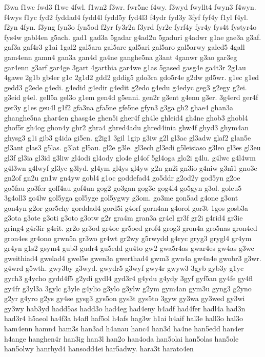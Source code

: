 {f3wa
f1wc
fwd3
f1we
4fwl.
f1wn2
f3wr.
fwr5ne
f4wy.
f3wyd
fwyllt4
fwyn3
f4wyn.
f4wys
f1yc
fyd2
fyddad4
fydd4l
fydd5y
fyd4l3
f4ydr
fyd3y
3fyf
fyf4y
f1yl
f4yl.
f2yn
4fyn.
f3yng
fyn3o
fyn5od
f2yr
fy3r2a
f3yrd
fyr2e
fyrf4y
fyr4y
fys4t
fystyr4o
fys4w
gabl4en
g5ach.
gad1
gad3a
5gadar
g4ad2u
5gaduri
g4adwr
g1ae
gae3a
g3af.
gaf3a
gaf4r3
g1ai
1gal2
gal5ara
gal5are
gal5ari
gal5aro
gal5arwy
galed5
4gall
gam4enn
gamn4
gan3a
gan4d
ga4ne
ganghe5na
g3ant
4ganwr
g3ao
gar3eg
gar4enn
g3arf
gar4ge
3gart
4garthia
gar4we
g1as
5gased
gasg4e
ga4t3r
2g1au
4gawe
2g1b
gb4er
g1c
2g1d2
gdd2
gddig5
gdo3ra
gdo5r4e
g2dw
gd5wr.
g1ec
g1ed
gedd3
g2ede
g4edi.
g4edid
g4edir
g4edit
g2edo
g4edu
g4edyc
geg3
g2egy
g2ei.
g3eid
g4el.
gell5a
gel3o
g1em
gen4d
g5enni.
gen2r
g3ent
g4enu
g3er.
3g4erd
ger4f
ger3y
g1es
geu4l
g1f2
gfa3na
gfa5ne
gfe5ne
gfyn3
g3ga
gh2
ghae4
ghan3a
ghanghe5na
ghar4en
ghasg4e
ghen5i
gher4f
gh4le
ghleid4
gh4ne
ghob3
ghobl4
ghof5r
gh4og
ghon4y
ghr2
ghra4
ghred4adu
ghred4inia
ghw4f
ghyd3
ghym4an
ghysg3
g1i
gib3
g4ida
gi5en.
g2ig1
3gil
1gip
g3iw
g2l
gl3ac
gl3adw
glaf2
glan5e
gl3ant
glas3
g5las.
g3lat
gl5au.
gl2e
g3le.
gl3ech
gl3edi
g5leisiaso
g3leo
gl3es
gl3eu
gl3f
gl3ia
gl3id
g3liw
gl4odi
gl4ody
glo4e
gl4of
5gl4oga
glo2i
g4lu.
g4lwc
g4l4wm
g4l3wn
g4lwyf
gl3yc
g3lyd.
gl4ym
gl4ys
gl4yw
g2n
gn2i
gn3io
g4niw
g3nï1
gno3e
gn2of
gn2u
gn1w
gn4yw
gobl4
g1oc
goddefad4
go5ddr
g2od2y
god5yn
g2oe
go5fau
go3fer
goff4au
gof4un
gog2
go3gan
gog3e
gog4l4
go5gyn
g3ol.
goleu5
3g4oll3
go4lw
gol5yga
gol5yge
gol5ygwy
g3om.
go3me
gon5ad
g4one
g3ont
gon4yn
g2or
gor5chy
gorddad4
gord5i
g4orf
gorn4an
g4orol
gor3t
1gos
gosb3a
g3ota
g3ote
g3oti
g3oto
g3otw
g2r
gra4m
gran3a
gr4el
gr3f
gr2i
g4rid4
gr3ie
gring4
g4r3ir
g4rit.
gr2o
gr3od
gr4oe
gr5oed
grof4
grog3
gron4a
gro5nas
gron4ed
gron4es
gr4ono
grwn5a
gr3wo
gr4wt
gr2wy
g5rwydd
g4ryc
gryg3
grygl4
gr4ym
gr4yn
g1s2
gsym4
gub3
gudr4
gu5edd
gu4to
gw2
gwa5r4as
gwar4es
gw4as
g3wc
gweithiad4
gwelad4
gwel5e
gwen3a
gwerthad4
gwm3
gwn4a
gw4n4e
gwobr3
g3wr.
g4wrd
g5wth.
gwy3by
g3wyd.
gwydr5
g3wyf
gwy4r
gwyw3
3gyb
gyb3y
g1yc
gych3
g4ycho
gydd4f5
g2ydi
gydl4
gyd3r4
g4ydu
g4ydy
3gyf
gyf5an
gy4fe
gy4fl
gy4fr
g3yl3a
3gylc
g3yle
g4ylio
g3ylo
g3ylw
g2ym
gym4an
gym3u
gyng3
g2yno
g2yr
g4yro
g2ys
gy4se
gysg3
gys5on
gys3t
gys5to
3gyw
gy3wa
gy3wed
gy3wi
gy3wy
hab3yd
hadd5as
hadd3o
had4eg
had4eny
h4adf
had4fer
hadl4a
had3n
had3r4
h5aeol
ha4f3a
h4afl
haf5ol
h4afs
hag3w
h1ai
h4aif
hal3e
hall3o
hal3o
ham4enn
hamn4
ham3s
han3ad
h4anau
hanc4
han3d
ha4ne
han5edd
han4er
h4ange
hanghen4r
han3ig
han3l
han2o
han4oda
han5olai
han5olas
han5ole
han5olwy
hanrhyd4
hansodd4ei
har5adwy.
hara3t
harato4en
}
